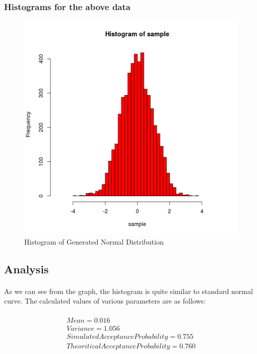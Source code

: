 \documentclass{article}
\begin{document}
		\subsubsection{Histograms for the above data}
			\begin{figure}[!ht]
  			\includegraphics[width=\linewidth]{pic/que1_in_R.png}
 			 \caption{Histogram of Generated Normal Distribution}
  			\label{fig:hist1_1}
		\end{figure}
		
		\subsection{Analysis}
		\paragraph{}
			As we can see from the graph, the histogram is quite similar to standard normal curve. The calculated values of various parameters are as follows:
		
	    \paragraph{}
		\begin{gather}	    
	    Mean=0.016\\
	    Variance=1.056\\
	    Simulated Acceptance Probability=0.755\\
	    Theoritical Acceptance Probability=0.760
	    \end{gather}
	    
\end{document}
